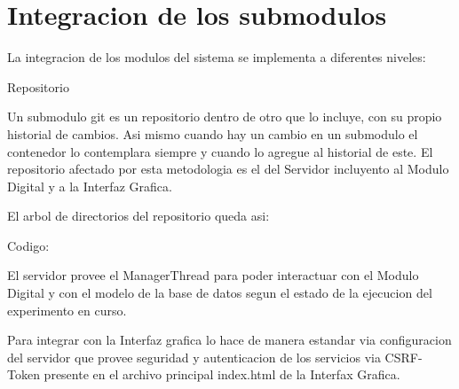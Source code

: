 \section{Integracion de los submodulos}

La integracion de los modulos del sistema se implementa a diferentes niveles:


Repositorio

Un submodulo git es un repositorio dentro de otro que lo incluye, con su propio historial de cambios. Asi mismo cuando hay un cambio en un submodulo el contenedor lo contemplara siempre y cuando lo agregue al historial de este.
El repositorio afectado por esta metodologia es el del Servidor incluyento al Modulo Digital y a la Interfaz Grafica.

El arbol de directorios del repositorio queda asi:


Codigo:

El servidor provee el ManagerThread para poder interactuar con el Modulo Digital y con el 
modelo de la base de datos segun el estado de la ejecucion del experimento en curso.

Para integrar con la Interfaz grafica lo hace de manera estandar via configuracion del servidor
que provee seguridad y autenticacion de los servicios via CSRF-Token presente en el archivo
principal index.html de la Interfax Grafica.
\newpage

